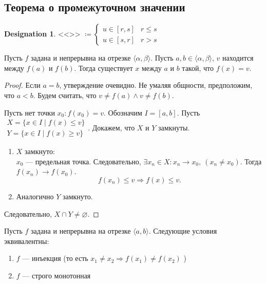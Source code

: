 \documentclass[11pt]{book}
\renewcommand{\le}{\leqslant}
\renewcommand{\ge}{\geqslant}
\theoremstyle{definition}
\theoremstyle{plain}
\theoremstyle{plain}
\theoremstyle{definition}
\newtheorem*{name}{Designation}
\theoremstyle{remark}
\begin{document}
\subsection{Теорема о промежуточном значении}
\begin{name}
    <<>> $\coloneqq
    \begin{cases}
	u \in [r, s] &  r \le s \\
	u \in [s, r] & r > s
    \end{cases}
    $
\end{name}
\begin{thm}
    Пусть $ f$ задана и непрерывна на отрезке  $ \langle \alpha , \beta \rangle$.  Пусть $ a, b \in  \langle \alpha , \beta  \rangle$, $ v$ находится между $ f(a) $ и $ f(b)$. Тогда существует $ x$ между  $ a$ и  $ b$ такой, что  $ f(x) = v$.
\end{thm}
\begin{proof}
    Если $ a = b$, утверждение очевидно.
    Не умаляя общности, предположим, что  $ a < b$. Будем считать, что  $ v \ne f(a) \wedge v \ne f(b)$.

    Пусть нет точки  $ x_0: f(x_0) = v$.
    Обозначим $ I = [a, b]$.
    Пусть $
    \begin{array}{l}
	X = \{x \in I\mid f(x) \le v\}\\
	Y = \{x \in I\mid f(x) \ge  v\}
    \end{array}
    $. %
    Докажем, что $ X$ и  $ Y$ замкнуты.
    \begin{enumerate}
	\item $ X$ замкнуто:\\
	    $ x_0$ --- предельная точка. Следовательно, $ \exists x_{n} \in X: x_{n} \to  x_0, ~ (x_{n} \ne  x_0)$.
	    Тогда $ f(x_{n}) \to  f(x_0)$.
	    \[
		f(x_{n}) \le  v \Longrightarrow f(x) \le  v
	    .\]
	\item Аналогично  $ Y$ замкнуто.
    \end{enumerate}
    Следовательно,  $ X \cap Y \ne \varnothing$.
\end{proof}
\begin{thm}
    Пусть $ f$ задана и непрерывна на отрезке $ \langle a, b \rangle$. Следующие условия эквивалентны:
    \begin{enumerate}
	\item $ f$ --- инъекция (то есть  $ x_1 \ne x_2 \Longrightarrow f(x_1) \ne f(x_2)$ )
	\item $ f$ --- строго монотонная
    \end{enumerate}
\end{thm}
\end{document}
